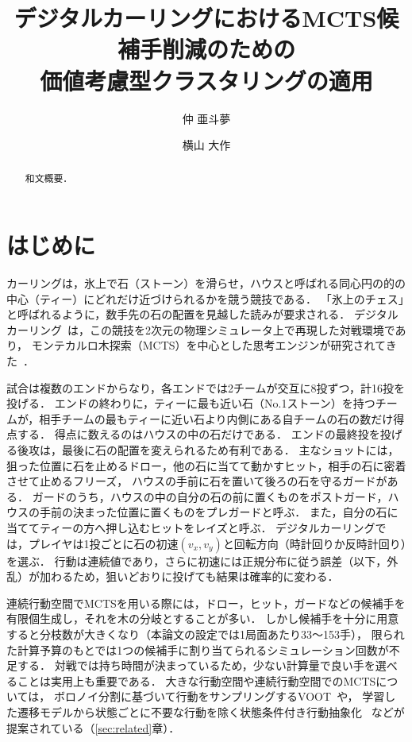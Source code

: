 \documentclass[submit]{ipsj}
\title{デジタルカーリングにおけるMCTS候補手削減のための\\価値考慮型クラスタリングの適用}
\author{仲 亜斗夢}{Atomu Naka}{MU}[ce265004@meiji.ac.jp]
\author{横山 大作}{Daisaku Yokoyama}{MU}[dyokoyama@meiji.ac.jp]
\begin{document}
\begin{abstract}
和文概要．
\end{abstract}

\maketitle
\thispagestyle{empty}

\section{はじめに}
カーリングは，氷上で石（ストーン）を滑らせ，ハウスと呼ばれる同心円の的の中心（ティー）にどれだけ近づけられるかを競う競技である．
「氷上のチェス」と呼ばれるように，数手先の石の配置を見越した読みが要求される．
デジタルカーリング~\cite{dc3}は，この競技を2次元の物理シミュレータ上で再現した対戦環境であり，
モンテカルロ木探索（MCTS）を中心とした思考エンジンが研究されてきた~\cite{owatari2016,kato2016,yee2016}．

試合は複数のエンドからなり，各エンドでは2チームが交互に8投ずつ，計16投を投げる．
エンドの終わりに，ティーに最も近い石（No.1ストーン）を持つチームが，相手チームの最もティーに近い石より内側にある自チームの石の数だけ得点する．
得点に数えるのはハウスの中の石だけである．
エンドの最終投を投げる後攻は，最後に石の配置を変えられるため有利である．
主なショットには，狙った位置に石を止めるドロー，他の石に当てて動かすヒット，相手の石に密着させて止めるフリーズ，
ハウスの手前に石を置いて後ろの石を守るガードがある．
ガードのうち，ハウスの中の自分の石の前に置くものをポストガード，ハウスの手前の決まった位置に置くものをプレガードと呼ぶ．
また，自分の石に当ててティーの方へ押し込むヒットをレイズと呼ぶ．
デジタルカーリングでは，プレイヤは1投ごとに石の初速$(v_x, v_y)$と回転方向（時計回りか反時計回り）を選ぶ．
行動は連続値であり，さらに初速には正規分布に従う誤差（以下，外乱）が加わるため，狙いどおりに投げても結果は確率的に変わる．

連続行動空間でMCTSを用いる際には，ドロー，ヒット，ガードなどの候補手を有限個生成し，それを木の分岐とすることが多い．
しかし候補手を十分に用意すると分枝数が大きくなり（本論文の設定では1局面あたり33〜153手），
限られた計算予算のもとでは1つの候補手に割り当てられるシミュレーション回数が不足する．
対戦では持ち時間が決まっているため，少ない計算量で良い手を選べることは実用上も重要である．
大きな行動空間や連続行動空間でのMCTSについては，
ボロノイ分割に基づいて行動をサンプリングするVOOT~\cite{kim2020voot}や，
学習した遷移モデルから状態ごとに不要な行動を除く状態条件付き行動抽象化~\cite{kwak2024}
などが提案されている（\ref{sec:related}章）．
\end{document}
